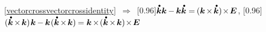 \begin{otherlanguage}{russian}
\noindent \eqref{vectorcrossvectorcrossidentity} $\,\Rightarrow\,$
\scalebox{0.95}[0.96]{$\mathdotabove{\bm{k}} \bm{k} \hspace{-0.1ex} - \hspace{-0.1ex} \bm{k} \mathdotabove{\bm{k}} = \hspace{-0.16ex} ( \bm{k} \hspace{-0.2ex} \times \hspace{-0.24ex} \mathdotabove{\bm{k}} ) \hspace{-0.32ex} \times \hspace{-0.32ex} \bm{E}$},\hspace{0.4ex}
%
\scalebox{0.95}[0.96]{${\displaystyle ( \mathdotabove{\bm{k}} \hspace{-0.2ex}\times\hspace{-0.24ex} \bm{k} ) \hspace{.2ex} \bm{k} \hspace{-0.1ex} - \hspace{-0.1ex} \bm{k} \hspace{.16ex} ( \mathdotabove{\bm{k}} \hspace{-0.2ex}\times\hspace{-0.24ex} \bm{k} ) \hspace{-0.12ex} = \bm{k} \hspace{-0.2ex} \times \hspace{-0.32ex} ( \mathdotabove{\bm{k}} \hspace{-0.2ex}\times\hspace{-0.24ex} \bm{k} ) \hspace{-0.32ex} \times \hspace{-0.32ex} \bm{E}}$\hspace{0.16ex}}


\end{otherlanguage}
